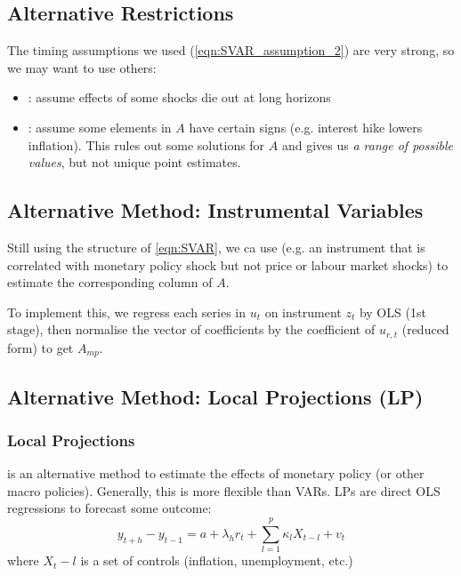         \subsection{Alternative Restrictions}

            The timing assumptions we used (\ref{eqn:SVAR_assumption_2}) are very strong, so we may want to use others:
            \begin{itemize}
                \item {}: assume effects of some shocks die out at long horizons
                \item {}: assume some elements in $A$ have certain signs (e.g. interest hike lowers inflation). This rules out some solutions for $A$ and gives us \emph{a range of possible values}, but not unique point estimates.
            \end{itemize}
        \subsection{Alternative Method: Instrumental Variables}

            Still using the structure of \ref{eqn:SVAR}, we ca use  (e.g. an instrument that is correlated with monetary policy shock but not price or labour market shocks) to estimate the corresponding column of $A$.

            To implement this, we regress each series in $u_t$ on instrument $z_t$ by OLS (1st stage), then normalise the vector of coefficients by the coefficient of $u_{r,t}$ (reduced form) to get $A_{mp}$.

        \subsection{Alternative Method: Local Projections (LP)}

            \subsubsection{Local Projections}
            
                 is an alternative method to estimate the effects of monetary policy (or other macro policies). Generally, this is more flexible than VARs. LPs are direct OLS regressions to forecast some outcome:
                \begin{equation}
                    y_{t+h}-y_{t-1}=a+\lambda_hr_t+\sum_{l=1}^p \kappa_l X_{t-l} +v_t
                    \tag{Local Projections}
                \end{equation}
                where $X_t-l$ is a set of controls (inflation, unemployment, etc.)
                
